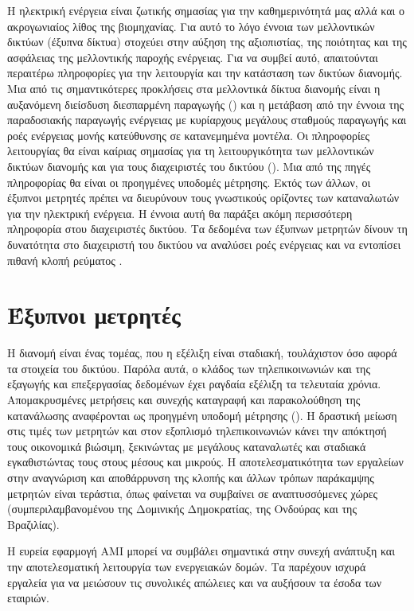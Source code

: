 Η ηλεκτρική ενέργεια είναι ζωτικής σημασίας για την καθημερινότητά μας αλλά και ο ακρογωνιαίος λίθος της βιομηχανίας. Για αυτό το λόγο έννοια των μελλοντικών δικτύων (έξυπνα δίκτυα) στοχεύει στην αύξηση της αξιοπιστίας, της ποιότητας και της ασφάλειας της μελλοντικής παροχής ενέργειας. Για να συμβεί αυτό, απαιτούνται περαιτέρω πληροφορίες για την λειτουργία και την κατάσταση των δικτύων διανομής. Μια από τις σημαντικότερες προκλήσεις στα μελλοντικά δίκτυα διανομής είναι η αυξανόμενη διείσδυση διεσπαρμένη παραγωγής () και η μετάβαση από την έννοια της παραδοσιακής παραγωγής ενέργειας με κυρίαρχους μεγάλους σταθμούς παραγωγής και ροές ενέργειας μονής κατεύθυνσης σε κατανεμημένα μοντέλα. Οι πληροφορίες λειτουργίας θα είναι καίριας σημασίας για τη λειτουργικότητα των μελλοντικών δικτύων διανομής και για τους διαχειριστές του δικτύου (). Μια από της πηγές πληροφορίας θα είναι οι προηγμένες υποδομές μέτρησης. Εκτός των άλλων, οι έξυπνοι μετρητές πρέπει να διευρύνουν τους γνωστικούς ορίζοντες των καταναλωτών για την ηλεκτρική ενέργεια. Η έννοια αυτή θα παράξει ακόμη περισσότερη πληροφορία στου διαχειριστές δικτύου. Τα δεδομένα των έξυπνων μετρητών δίνουν τη δυνατότητα στο διαχειριστή του δικτύου να αναλύσει ροές ενέργειας και να εντοπίσει πιθανή κλοπή ρεύματος \cite{netherlands}. \\
\section{Έξυπνοι μετρητές}
Η διανομή είναι ένας τομέας, που η εξέλιξη είναι σταδιακή, τουλάχιστον όσο αφορά τα στοιχεία του δικτύου. Παρόλα αυτά, ο κλάδος των τηλεπικοινωνιών και της εξαγωγής και επεξεργασίας δεδομένων έχει ραγδαία εξέλιξη τα τελευταία χρόνια. Απομακρυσμένες μετρήσεις και συνεχής καταγραφή και παρακολούθηση της κατανάλωσης αναφέρονται ως προηγμένη υποδομή μέτρησης (). Η δραστική μείωση στις τιμές των μετρητών και στον εξοπλισμό τηλεπικοινωνιών κάνει την απόκτησή τους οικονομικά βιώσιμη, ξεκινώντας με μεγάλους καταναλωτές και σταδιακά εγκαθιστώντας τους στους μέσους και μικρούς. Η αποτελεσματικότητα των εργαλείων στην αναγνώριση και αποθάρρυνση της κλοπής και άλλων τρόπων παράκαμψης μετρητών είναι τεράστια, όπως φαίνεται να συμβαίνει σε αναπτυσσόμενες χώρες (συμπεριλαμβανομένου της Δομινικής Δημοκρατίας, της Ονδούρας και της Βραζιλίας).\par
Η ευρεία εφαρμογή AMI μπορεί να συμβάλει σημαντικά στην συνεχή ανάπτυξη και την αποτελεσματική λειτουργία των ενεργειακών δομών. Τα  παρέχουν ισχυρά εργαλεία για να μειώσουν τις συνολικές απώλειες και να αυξήσουν τα έσοδα των εταιριών.
